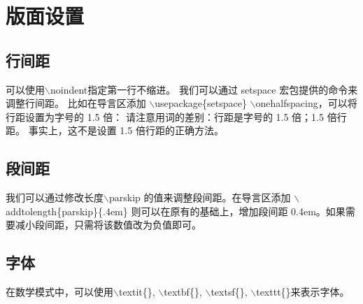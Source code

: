 \section{版面设置}
\subsection{行间距}
\noindent 可以使用$\backslash$noindent指定第一行不缩进。
我们可以通过 setspace 宏包提供的命令来调整行间距。
比如在导言区添加
$\backslash$usepackage\{setspace\}
$\backslash$onehalfspacing，可以将行距设置为字号的 1.5 倍：
请注意用词的差别：行距是字号的 1.5 倍；1.5 倍行距。
事实上，这不是设置 1.5 倍行距的正确方法。
\subsection{段间距}
我们可以通过修改长度$\backslash$parskip 的值来调整段间距。在导言区添加
$\backslash$addtolength\{par\-skip\}\{.4em\}
则可以在原有的基础上，增加段间距 0.4em。如果需要减小段间距，只需将该数值改为负值即可。
\subsection{字体}
在数学模式中，可以使用$\backslash$textit\{\}, $\backslash$textbf\{\}, 
$\backslash$textsf\{\}, $\backslash$texttt\{\}来表示字体。